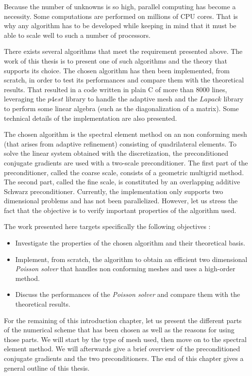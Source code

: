 Because the number of unknowns is so high, parallel computing has become a necessity. Some computations are performed on millions of CPU cores. That is why any algorithm has to be developed while keeping in mind that it must be able to scale well to such a number of processors. 

There exists several algorithms that meet the requirement presented above. The work of this thesis is to present one of such algorithms and the theory that supports its choice. The chosen algorithm has then been implemented, from scratch, in order to test its performances and compare them with the theoretical results. That resulted in a code written in plain C of more than 8000 lines, leveraging the $p4est$ library to handle the adaptive mesh and the $Lapack$ library to perform some linear algebra (such as the diagonalization of a matrix). Some technical details of the implementation are also presented. 

The chosen algorithm is the spectral element method on an non conforming mesh (that arises from adaptive refinement) consisting of quadrilateral elements. To solve the linear system obtained with the discretization, the preconditioned conjugate gradients are used with a two-scale preconditioner. The first part of the preconditioner, called the coarse scale, consists of a geometric multigrid method. The second part, called the fine scale, is constituted by an overlapping additive Schwarz preconditioner. Currently, the implementation only supports two dimensional problems and has not been parallelized. However, let us stress the fact that the objective is to verify important properties of the algorithm used.

The work presented here targets specifically the following objectives : 
\begin{itemize}
\item Investigate the properties of the chosen algorithm and their theoretical basis.
\item Implement, from scratch, the algorithm to obtain an efficient two dimensional \textit{Poisson solver} that handles non conforming meshes and uses a high-order method.
\item Discuss the performances of the \textit{Poisson solver} and compare them with the theoretical results. 
\end{itemize}


For the remaining of this introduction chapter, let us present the different parts of the numerical scheme that has been chosen as well as the reasons for using those parts. We will start by the type of mesh used, then move on to the spectral element method. We will afterwards give a brief overview of the preconditioned conjugate gradients and the two preconditioners. The end of this chapter gives a general outline of this thesis. 



